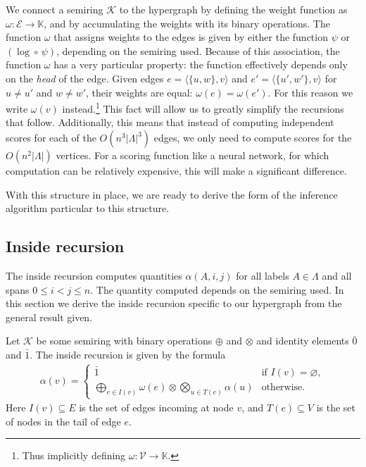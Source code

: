   We connect a semiring $\mathcal{K}$ to the hypergraph by defining the weight function as $\omega: \mathcal{E} \to \mathbb{K}$, and by accumulating the weights with its binary operations. The function $\omega$ that assigns weights to the edges is given by either the function $\psi$ or $(\log \circ \, \psi)$, depending on the semiring used. Because of this association, the function $\omega$ has a very particular property: the function effectively depends only on the \textit{head} of the edge. Given edges $e = \langle \{ u, w \}, v \rangle$ and $e' =  \langle \{ u', w' \}, v \rangle$ for $u \neq u'$ and $w \neq w'$, their weights are equal: $\omega(e) = \omega(e')$. For this reason we write $\omega(v)$ instead.\footnote{Thus implicitly defining $\omega: \mathcal{V} \to \mathbb{K}$.} This fact will allow us to greatly simplify the recursions that follow. Additionally, this means that instead of computing independent scores for each of the $O(n^3 \vert\Lambda\rvert^3)$ edges, we only need to compute scores for the $O(n^2 \vert\Lambda\rvert)$ vertices. For a scoring function like a neural network, for which computation can be relatively expensive, this will make a significant difference.

 With this structure in place, we are ready to derive the form of the inference algorithm particular to this structure.


\subsection{Inside recursion}
  The inside recursion computes quantities $\alpha(A,i,j)$ for all labels $A \in \Lambda$ and all spans $0 \leq i < j \leq n$. The quantity computed depends on the semiring used. In this section we derive the inside recursion specific to our hypergraph from the general result given.

  Let $\mathcal{K}$ be some semiring with binary operations $\oplus$ and $\otimes$ and identity elements $\bar{0}$ and $\bar{1}$. The inside recursion is given by the formula \citep{goodman1999semiring}
  \begin{align*}
    \alpha(v) =
      \begin{cases}
        \bar{1}  &  \mbox{if } I(v) = \varnothing,  \\
        \displaystyle\bigoplus_{e \in I(v)} \omega(e) \otimes \displaystyle\bigotimes_{u \in T(e)} \alpha(u)  & \mbox{otherwise.}
      \end{cases}
  \end{align*}
  Here $I(v) \subseteq E$ is the set of edges incoming at node $v$, and $T(e) \subseteq V$ is the set of nodes in the tail of edge $e$.

